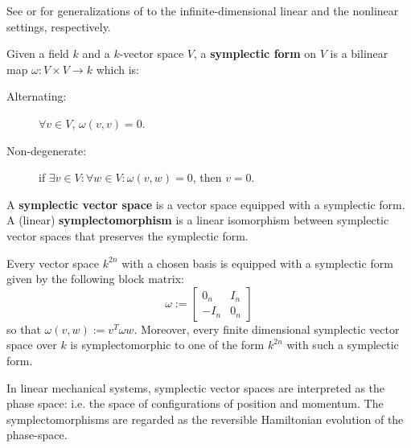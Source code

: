 See \cite{Weinstein2017} or  \cite{weinsteinsymplectic} for generalizations of to the infinite-dimensional linear and the nonlinear settings, respectively.
\begin{definition}
  Given a field  $k$ and a $k$-vector space $V$, a {\bf symplectic form} on $V$ is a bilinear map $\omega:V\times V\to k$ which is:
\begin{description}
 \item[Alternating:] $\forall v \in V$, $\omega(v,v)=0$.
 \item[Non-degenerate:] if $\exists v \in V: \forall w \in V: \omega(v,w)=0$, then $v=0$.
\end{description}
  A {\bf symplectic vector space} is a vector space equipped with a symplectic form. A (linear) {\bf symplectomorphism} is a linear isomorphism between symplectic vector spaces that preserves the symplectic form.
\end{definition}
\begin{lemma}
\label{lemma:sform}
Every vector space $k^{2n}$ with a chosen basis is equipped with a symplectic form given by the following block matrix:
$$
\omega:=
\begin{bmatrix}
0_n & I_n\\
-I_n & 0_n
\end{bmatrix}
$$
so that $\omega(v,w) := v^T \omega w$.
Moreover, every finite dimensional symplectic vector space over $k$ is symplectomorphic to one of the form $k^{2n}$ with such a symplectic form.
\end{lemma}

In linear mechanical systems, symplectic vector spaces are interpreted as  the phase space: i.e. the space of configurations of position and momentum.  The symplectomorphisms are regarded as the reversible Hamiltonian evolution of the phase-space.

